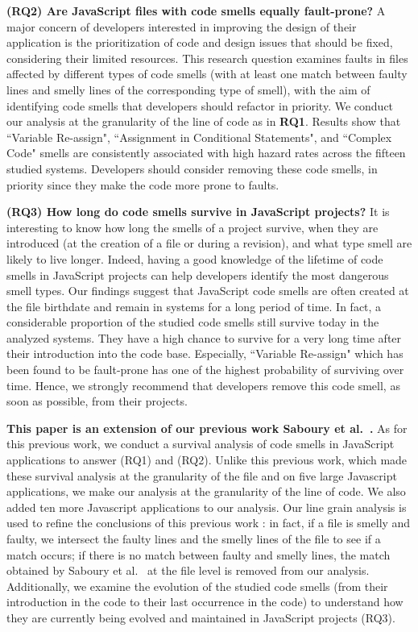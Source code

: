 \documentclass[smallcondensed]{svjour3}
\begin{document}
\textbf{(RQ2) Are JavaScript files with code smells equally fault-prone?}
A major concern of developers interested in improving the design of their application is the prioritization of code and design issues that should be fixed, considering their limited resources. This research question examines faults in files affected by different types of code smells {\color{blue}(with at least one match between faulty lines and smelly lines of the corresponding type of smell)}, with the aim of identifying code smells that developers should refactor in priority. We conduct our analysis at the granularity of the line of code as in \textbf{RQ1}. %
Results show that ``Variable Re-assign", ``Assignment in Conditional Statements", and ``Complex Code" smells are consistently associated with high hazard rates across the fifteen studied systems. Developers should consider removing these code smells, in priority since they make the code more prone to faults.

\textbf{(RQ3) How long do code smells survive in JavaScript projects?}
It is interesting to know how long the smells of a project survive, when they are introduced (at the creation of a file or during a revision), and what type smell are likely to live longer. Indeed, having a good knowledge of the lifetime of code smells in JavaScript projects can help developers identify the most dangerous smell types. Our findings suggest that JavaScript code smells are often created at the file birthdate and remain in systems for a long period of time. In fact, a considerable proportion of the studied code smells still survive today in the analyzed systems. They have a high chance to survive for a very long time after their introduction into the code base. Especially, ``Variable Re-assign" which has been found to be fault-prone has one of the highest probability of surviving over time. Hence, we strongly recommend that developers remove this code smell, as soon as possible, from their projects. %

{\color{blue}\textbf{This paper is an extension of our previous work Saboury et al.~\cite{saboury2017empirical}.} As for this previous work, we conduct a survival analysis of code smells in JavaScript applications to answer (RQ1) and (RQ2). Unlike this previous work, which made these survival analysis at the granularity of the file and on five large Javascript applications, we make our analysis at the granularity of the line of code. We also added ten more Javascript applications to our analysis. Our line grain analysis is used to refine the conclusions of this previous work : in fact, if a file is smelly and faulty, we intersect the faulty lines and the smelly lines of the file to see if a match occurs; if there is no match between faulty and smelly lines, the match obtained by Saboury et al.~\cite{saboury2017empirical} at the file level is removed from our analysis. Additionally, we examine the evolution of the studied code smells (from their introduction in the code to their last occurrence in the code) to understand how they are currently being evolved and maintained in JavaScript projects (RQ3).}
\end{document}
